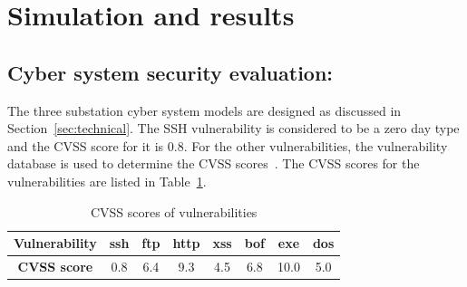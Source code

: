 \section{Simulation and results}\label{sec:simulation}
\subsection{Cyber system security evaluation:} 
The three substation cyber system models are designed as discussed in Section~\ref{sec:technical}. The SSH vulnerability is considered to be a zero day type and the CVSS score for it is $0.8$. For the other vulnerabilities, the vulnerability database is used to determine the CVSS scores~\cite{nist1,nist2,ftp,http,ssh}. The CVSS scores for the vulnerabilities are listed in Table~\ref{tbl:CVSS}.
\begin{table}[ht]
	\centering
	\small
	\caption{CVSS scores of vulnerabilities}
	\label{tbl:CVSS}
	\begin{tabular}{|c|c|c|c|c|c|c|c|}
		\hline
		\textbf{Vulnerability} & ssh & ftp & http & xss & bof & exe & dos \\ \hline
		\textbf{CVSS score}    & 0.8 & 6.4 & 9.3  & 4.5 & 6.8 & 10.0& 5.0 \\ \hline
	\end{tabular}
\end{table}

